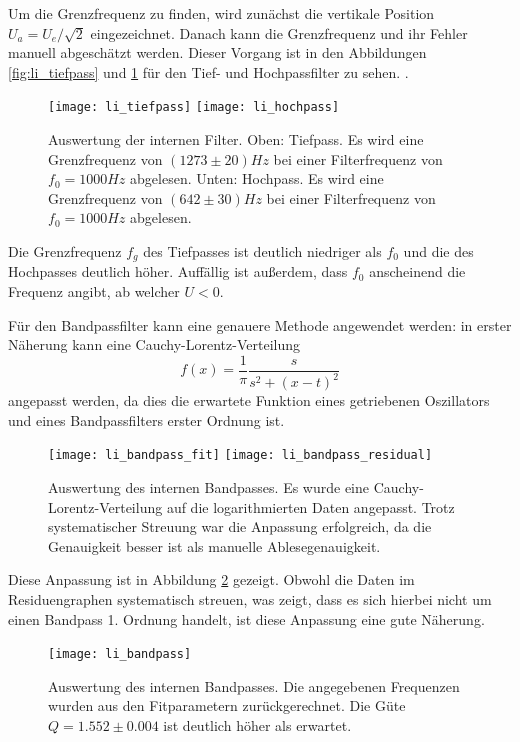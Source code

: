 \documentclass{../Misc/MontavonLaTeX/Montavon}
\begin{document}
Um die Grenzfrequenz zu finden, wird zunächst die vertikale Position $U_a = U_e / \sqrt{2}$ eingezeichnet. Danach kann die Grenzfrequenz und ihr Fehler manuell abgeschätzt werden. Dieser Vorgang ist in den Abbildungen \ref{fig:li_tiefpass} und \ref{fig:li_hochpass} für den Tief- und Hochpassfilter zu sehen. .

\begin{figure}[htbp]
\centering
\texttt{[image: li\_tiefpass]}
\texttt{[image: li\_hochpass]}
\caption{Auswertung der internen Filter. Oben: Tiefpass. Es wird eine Grenzfrequenz von $(1273 \pm 20) \unit{Hz}$ bei einer Filterfrequenz von $f_0 = 1000 \unit{Hz}$ abgelesen. Unten: Hochpass. Es wird eine Grenzfrequenz von $(642 \pm 30) \unit{Hz}$ bei einer Filterfrequenz von $f_0 = 1000 \unit{Hz}$ abgelesen.}
\label{fig:li_hochpass}
\end{figure}

Die Grenzfrequenz $f_g$ des Tiefpasses ist deutlich niedriger als $f_0$ und die des Hochpasses deutlich höher. Auffällig ist außerdem, dass $f_0$ anscheinend die Frequenz angibt, ab welcher $U < 0$.

Für den Bandpassfilter kann eine genauere Methode angewendet werden: in erster Näherung kann eine Cauchy-Lorentz-Verteilung 
\[
	f(x) = \frac{1}{\pi} \frac{s}{s^2 + (x-t)^2}
\]
angepasst werden, da dies die erwartete Funktion eines getriebenen Oszillators und eines Bandpassfilters erster Ordnung ist.

\begin{figure}[htbp]
\centering
\texttt{[image: li\_bandpass\_fit]}
\texttt{[image: li\_bandpass\_residual]}
\caption{Auswertung des internen Bandpasses. Es wurde eine Cauchy-Lorentz-Verteilung auf die logarithmierten Daten angepasst. Trotz systematischer Streuung war die Anpassung erfolgreich, da die Genauigkeit besser ist als manuelle Ablesegenauigkeit.}
\label{fig:li_bandpass}
\end{figure}

Diese Anpassung ist in Abbildung \ref{fig:li_bandpass} gezeigt. Obwohl die Daten im Residuengraphen systematisch streuen, was zeigt, dass es sich hierbei nicht um einen Bandpass 1. Ordnung handelt, ist diese Anpassung eine gute Näherung.

\begin{figure}[htbp]
\centering
\texttt{[image: li\_bandpass]}
\caption{Auswertung des internen Bandpasses. Die angegebenen Frequenzen wurden aus den Fitparametern zurückgerechnet. Die Güte $Q = 1.552 \pm 0.004$ ist deutlich höher als erwartet.}
\label{fig:li_bandpass2}
\end{figure} 
\end{document}
